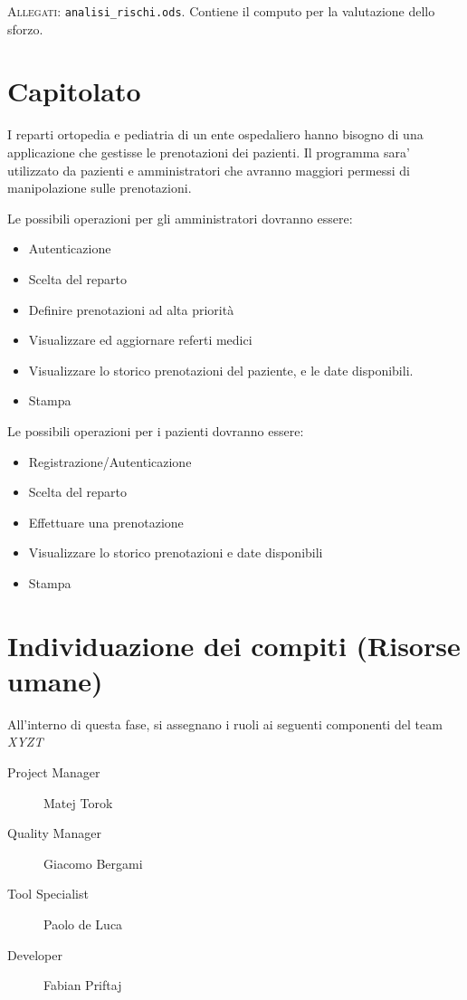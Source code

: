 \textsc{Allegati}: \texttt{analisi\_rischi.ods}. Contiene il computo per la valutazione
dello sforzo.

\section{Capitolato}
 I reparti ortopedia e pediatria di un ente ospedaliero hanno bisogno di una
 applicazione che gestisse le prenotazioni dei pazienti. Il programma sara'
 utilizzato da pazienti e amministratori che avranno maggiori permessi di
 manipolazione sulle prenotazioni.
 
 Le possibili operazioni per gli amministratori dovranno essere:
\begin{itemize}
\item Autenticazione
\item Scelta del reparto
\item Definire prenotazioni ad alta priorità
\item Visualizzare ed aggiornare referti medici
\item Visualizzare lo storico prenotazioni del paziente, e le date disponibili.
\item Stampa
\end{itemize}
 Le possibili operazioni per i pazienti dovranno essere:
\begin{itemize}

\item Registrazione/Autenticazione
\item Scelta del reparto
\item Effettuare una prenotazione
\item Visualizzare lo storico prenotazioni e date disponibili
\item Stampa 
\end{itemize}
\section{Individuazione dei compiti (Risorse umane)}
All'interno di questa fase, si assegnano i ruoli ai seguenti componenti del
team \textit{XYZT}
\begin{description}
\item[Project Manager] Matej Torok
\item[Quality Manager] Giacomo Bergami
\item[Tool Specialist] Paolo de Luca
\item[Developer]       Fabian Priftaj
\end{description}

